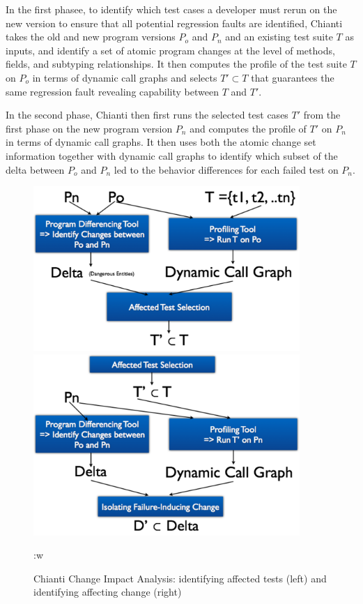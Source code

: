 In the first phasee, to identify which test cases a developer must rerun on the new version to ensure that all potential regression faults are identified, Chianti takes the old and new program versions $P_o$ and $P_n$ and an existing test suite $T$ as inputs, and identify a set of atomic program changes at the level of methods, fields, and subtyping relationships. It then computes the profile of the test suite $T$ on $P_o$ in terms of dynamic call graphs and selects $T'\subset T$ that guarantees the same regression fault revealing capability between $T$ and $T'$. 

In the second phase, Chianti then first runs the selected test cases $T'$ from the first phase on the new program version $P_n$ and computes the profile of $T'$ on $P_n$ in terms of dynamic call graphs. It then uses both the atomic change set information together with dynamic call graphs to identify which subset of the delta between $P_o$ and $P_n$ led to the behavior differences for each failed test on $P_n$. 

\begin{figure}
\centering
\begin{minipage}{.45\textwidth}
  \centering
\includegraphics[width=0.9\textwidth]{images/ChiantiPhase1.pdf}
\end{minipage}
\begin{minipage}{.45\textwidth}
  \centering
\includegraphics[width=0.9\textwidth]{images/ChiantiPhase2.pdf}
\end{minipage}:w

\caption{Chianti Change Impact Analysis: identifying affected tests (left) and identifying affecting change (right)~\cite{Ren2004}} 
\label{fig:twophase} 
\end{figure}

